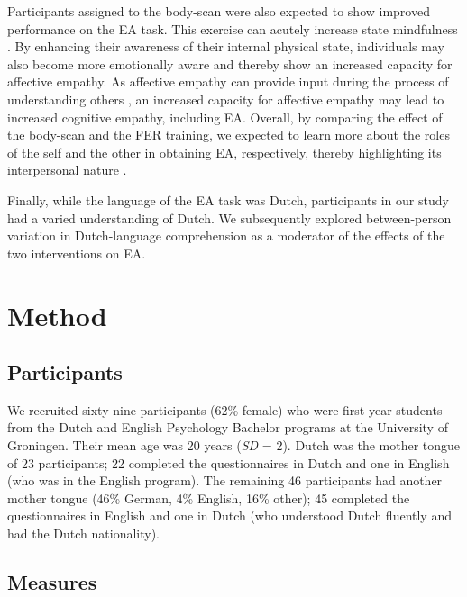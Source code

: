 \documentclass[authordate, empirical]{jote-new-article}
\begin{document}
	Participants assigned to the body-scan were also expected to show improved performance on the EA task. This exercise can acutely increase state mindfulness \parencites{Upton2019}. By enhancing their awareness of their internal physical state, individuals may also become more emotionally aware and thereby show an increased capacity for affective empathy. As affective empathy can provide input during the process of understanding others \parencites{Cuff2016}, an increased capacity for affective empathy may lead to increased cognitive empathy, including EA. Overall, by comparing the effect of the body-scan and the FER training, we expected to learn more about the roles of the self and the other in obtaining EA, respectively, thereby highlighting its interpersonal nature \parencites{Zaki2008}.



	Finally, while the language of the EA task was Dutch, participants in our study had a varied understanding of Dutch. We subsequently explored between-person variation in Dutch-language comprehension as a moderator of the effects of the two interventions on EA.







	\section{Method}



	\subsection{Participants}



	We recruited sixty-nine participants (62\% female) who were first-year students from the Dutch and English Psychology Bachelor programs at the University of Groningen. Their mean age was 20 years (\emph{SD }= 2). Dutch was the mother tongue of 23 participants; 22 completed the questionnaires in Dutch and one in English (who was in the English program). The remaining 46 participants had another mother tongue (46\% German, 4\% English, 16\% other); 45 completed the questionnaires in English and one in Dutch (who understood Dutch fluently and had the Dutch nationality).



	\subsection{Measures}
\end{document}
